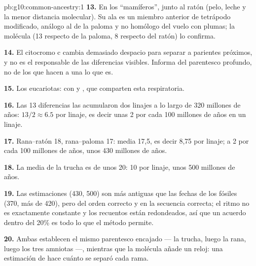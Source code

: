 \begin{solution}{pb:g10:common-ancestry:1}
\textbf{13.} En los ``mamíferos'', junto al ratón (pelo, leche y la
menor distancia molecular). Su ala es un miembro anterior de tetrápodo
modificado, análogo al de la paloma y no homólogo del vuelo con plumas;
la molécula (13 respecto de la paloma, 8 respecto del ratón) lo
confirma.

\textbf{14.} El citocromo c cambia demasiado despacio para separar a
parientes próximos, y no es el  responsable de las diferencias
visibles. Informa del parentesco profundo, no de los  que hacen a
una  lo que es.

\textbf{15.} Los eucariotas:  con  y , que
comparten esta  respiratoria.

\textbf{16.} Las 13 diferencias las acumularon dos linajes a lo largo
de 320 millones de años: $13/2 \approx 6.5$ por linaje, es decir unas 2
por cada 100 millones de años en un linaje.

\textbf{17.} Rana--ratón 18, rana--paloma 17: media 17,5, es decir 8,75
por linaje; a 2 por cada 100 millones de años, unos 430 millones de
años.

\textbf{18.} La media de la trucha es de unos 20: 10 por linaje, unos
500 millones de años.

\textbf{19.} Las estimaciones (430, 500) son más antiguas que las
fechas de los fósiles (370, más de 420), pero del orden correcto y en
la secuencia correcta; el ritmo no es exactamente constante y los
recuentos están redondeados, así que un acuerdo dentro del 20\% es todo
lo que el método permite.

\textbf{20.} Ambas establecen el mismo parentesco encajado --- la
trucha, luego la rana, luego los tres amniotas ---, mientras que la
molécula añade un reloj: una estimación de hace cuánto se separó cada
rama.
\end{solution}
